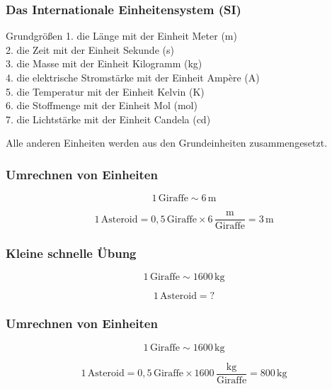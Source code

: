 \documentclass{beamer}
\begin{document}

\begin{frame}

\frametitle{Das Internationale Einheitensystem (SI)}


\begin{block}{Grundgrößen}
1. die Länge mit der Einheit Meter (m) \\
2. die Zeit mit der Einheit Sekunde (s) \\
3. die Masse mit der Einheit Kilogramm (kg) \\
4. die elektrische Stromstärke mit der Einheit Ampère (A) \\
5. die Temperatur mit der Einheit Kelvin (K) \\
6. die Stoffmenge mit der Einheit Mol (mol) \\
7. die Lichtstärke mit der Einheit Candela (cd) \\
\end{block}

\pause

Alle anderen Einheiten werden aus den Grundeinheiten zusammengesetzt. 

\end{frame}


\begin{frame}
\frametitle{Umrechnen von Einheiten}

\[1\, \text{Giraffe} \sim 6\,\text{m} \]

\[
1\,\text{Asteroid} = 0,5\, \text{Giraffe} \times 6\, \frac{\text{m}}{\text{Giraffe}} = 3\,\text{m}
\]


\end{frame}


\begin{frame}
\frametitle{Kleine schnelle Übung}

\[1\, \text{Giraffe} \sim 1600\,\text{kg} \]

\[
1\,\text{Asteroid} =  ?
\]


\end{frame}


\begin{frame}
\frametitle{Umrechnen von Einheiten}

\[1\, \text{Giraffe} \sim 1600\,\text{kg} \]

\[
1\,\text{Asteroid} =  0,5\, \text{Giraffe} \times 1600\, \frac{\text{kg}}{\text{Giraffe}} = 800\,\text{kg}
\]


\end{frame}
\end{document}
